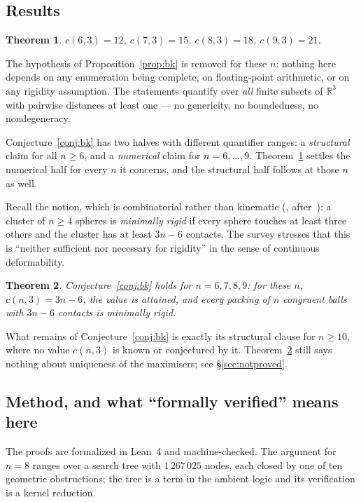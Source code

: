 \documentclass[11pt,a4paper]{article}
\theoremstyle{plain}
\newtheorem{theorem}{Theorem}[section]
\theoremstyle{definition}
\newcommand{\R}{\mathbb{R}}
\begin{document}
\subsection*{Results}

\begin{theorem}
\label{thm:main}
$c(6,3) = 12$, \quad $c(7,3) = 15$, \quad $c(8,3) = 18$, \quad $c(9,3) = 21$.
\end{theorem}

The hypothesis of Proposition~\ref{prop:bk} is removed for these $n$: nothing here
depends on any enumeration being complete, on floating-point arithmetic, or on any
rigidity assumption. The statements quantify over \emph{all} finite subsets of $\R^3$
with pairwise distances at least one --- no genericity, no boundedness, no
nondegeneracy.

Conjecture~\ref{conj:bk} has two halves with different quantifier ranges: a
\emph{structural} claim for all $n \ge 6$, and a \emph{numerical} claim for
$n = 6,\dots,9$. Theorem~\ref{thm:main} settles the numerical half for every $n$ it
concerns, and the structural half follows at those $n$ as well.

Recall the notion, which is combinatorial rather than kinematic
(\cite[Def.~1]{BezdekKhan2018}, after~\cite{ArkusSIAM2011}): a cluster of $n \ge 4$
spheres is \emph{minimally rigid} if every sphere touches at least three others and the
cluster has at least $3n-6$ contacts. The survey stresses that this is ``neither
sufficient nor necessary for rigidity'' in the sense of continuous deformability.

\begin{theorem}
\label{thm:conj52}
Conjecture~\ref{conj:bk} holds for $n = 6, 7, 8, 9$: for these $n$, $c(n,3) = 3n-6$,
the value is attained, and \emph{every} packing of $n$ congruent balls with $3n-6$
contacts is minimally rigid.
\end{theorem}

What remains of Conjecture~\ref{conj:bk} is exactly its structural clause for
$n \ge 10$, where no value $c(n,3)$ is known or conjectured by it. Theorem~\ref{thm:conj52}
still says nothing about uniqueness of the maximisers; see \S\ref{sec:notproved}.

\subsection*{Method, and what ``formally verified'' means here}

The proofs are formalized in Lean~4 and machine-checked. The argument for $n=8$
ranges over a search tree with $1\,267\,025$ nodes, each closed by one of ten geometric
obstructions; the tree is a term in the ambient logic and its verification is a kernel
reduction.
\end{document}
